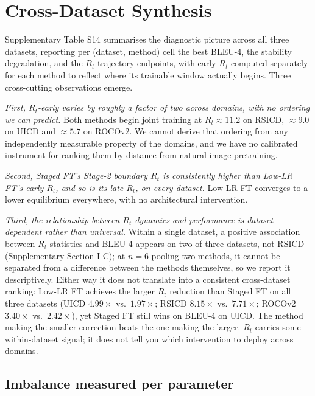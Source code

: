 \documentclass[journal]{IEEEtran}
\begin{document}
\section{Cross-Dataset Synthesis}
\label{sec:cross-dataset}

Supplementary Table S14 summarises the diagnostic picture across all three datasets, reporting per (dataset, method) cell the best BLEU-4, the stability degradation, and the $R_t$ trajectory endpoints, with early $R_t$ computed separately for each method to reflect where its trainable window actually begins. Three cross-cutting observations emerge.

\emph{First, $R_t$-early varies by roughly a factor of two across
domains, with no ordering we can predict.} Both methods begin joint training at $R_t \approx 11.2$ on RSICD, $\approx 9.0$ on UICD and $\approx 5.7$ on ROCOv2. We cannot derive that ordering from any independently measurable property of the domains, and we have no calibrated instrument for ranking them by distance from natural-image pretraining.

\emph{Second, Staged FT's Stage-2 boundary $R_t$ is consistently
higher than Low-LR FT's early $R_t$, and so is its late $R_t$, on
every dataset.} Low-LR FT converges to a lower equilibrium everywhere, with no architectural intervention.

\emph{Third, the relationship between $R_t$ dynamics and performance is dataset-dependent rather than universal.} Within a single dataset, a positive association between $R_t$ statistics and BLEU-4 appears on two of three datasets, not RSICD
(Supplementary Section I-C); at $n{=}6$ pooling two methods, it cannot be separated from a difference between the methods themselves, so we report it descriptively. Either way it does not translate into a consistent cross-dataset ranking: Low-LR FT
achieves the larger $R_t$ reduction than Staged FT on all three datasets (UICD $4.99\times$ vs.\ $1.97\times$; RSICD $8.15\times$ vs.\ $7.71\times$; ROCOv2 $3.40\times$ vs.\ $2.42\times$), yet Staged FT still wins on BLEU-4 on UICD. The method making the smaller correction beats the one making the larger. $R_t$ carries some within-dataset signal; it does not tell you which intervention to deploy across domains.

\subsection{Imbalance measured per parameter}
\label{sec:normalised-analysis}
\end{document}

